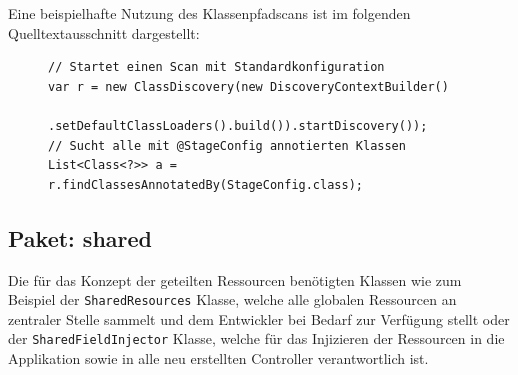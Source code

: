 \noindent Eine beispielhafte Nutzung des Klassenpfadscans ist im folgenden Quelltextausschnitt dargestellt:
\begin{figure}[H]
	\begin{lstlisting}[caption=Beispiel -- Initiierung eines Klassenpfadscans., captionpos=b, label=lst:classpath_scan_usage]
// Startet einen Scan mit Standardkonfiguration
var r = new ClassDiscovery(new DiscoveryContextBuilder()
		.setDefaultClassLoaders().build()).startDiscovery());
// Sucht alle mit @StageConfig annotierten Klassen
List<Class<?>> a = r.findClassesAnnotatedBy(StageConfig.class);
	\end{lstlisting}
\end{figure}
\subsection{Paket: shared}
Die für das Konzept der geteilten Ressourcen benötigten Klassen wie zum Beispiel der \texttt{SharedResources} Klasse, welche alle globalen Ressourcen an zentraler Stelle sammelt und dem Entwickler bei Bedarf zur Verfügung stellt oder der \texttt{SharedFieldInjector} Klasse, welche für das Injizieren der Ressourcen in die Applikation sowie in alle neu erstellten Controller verantwortlich ist.

